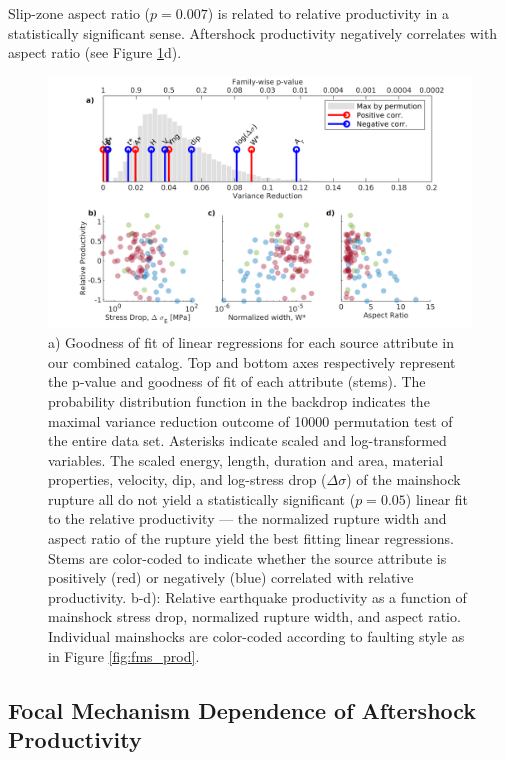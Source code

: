 \documentclass[draft, jgrga]{agujournal2018}
\begin{document}
    Slip-zone aspect ratio ($p = 0.007$) is related to relative productivity in a statistically significant sense. Aftershock productivity negatively correlates with aspect ratio (see Figure \ref{fig:r2_finite_fault}d).

    \begin{figure}
        \centering
        \includegraphics[width = \linewidth]{stem_plot.png}
        \caption{a) Goodness of fit of linear regressions for each source attribute in our combined catalog. Top and bottom axes respectively represent the p-value and goodness of fit of each attribute (stems). The probability distribution function in the backdrop indicates the maximal variance reduction outcome of 10000 permutation test of the entire data set. Asterisks indicate scaled and log-transformed variables. The scaled energy, length, duration and area, material properties, velocity, dip, and log-stress drop ($\Delta\sigma$) of the mainshock rupture all do not yield a statistically significant ($p=0.05$) linear fit to the relative productivity — the normalized rupture width and aspect ratio of the rupture yield the best fitting linear regressions. Stems are color-coded to indicate whether the source attribute is positively (red) or negatively (blue) correlated with relative productivity. b-d): Relative earthquake productivity as a function of mainshock stress drop, normalized rupture width, and aspect ratio. Individual mainshocks are color-coded according to faulting style as in Figure \ref{fig:fms_prod}.}
        \label{fig:r2_finite_fault}
    \end{figure}

    \subsection{Focal Mechanism Dependence of Aftershock Productivity}
\end{document}
